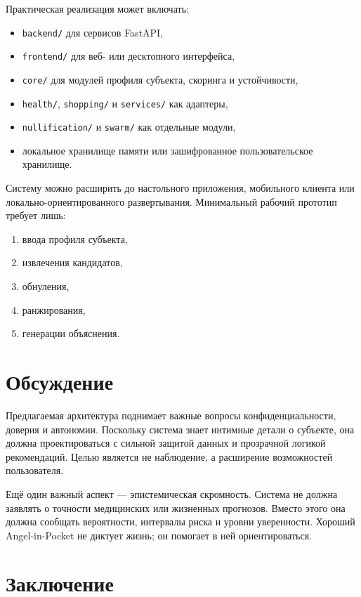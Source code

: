 \documentclass[11pt,a4paper]{article}
\begin{document}
Практическая реализация может включать:
\begin{itemize}[leftmargin=1.2em]
    \item \texttt{backend/} для сервисов FastAPI,
    \item \texttt{frontend/} для веб- или десктопного интерфейса,
    \item \texttt{core/} для модулей профиля субъекта, скоринга и устойчивости,
    \item \texttt{health/}, \texttt{shopping/} и \texttt{services/} как адаптеры,
    \item \texttt{nullification/} и \texttt{swarm/} как отдельные модули,
    \item локальное хранилище памяти или зашифрованное пользовательское хранилище.
\end{itemize}

Систему можно расширить до настольного приложения, мобильного клиента или локально-ориентированного развертывания. Минимальный рабочий прототип требует лишь:
\begin{enumerate}[leftmargin=1.2em]
    \item ввода профиля субъекта,
    \item извлечения кандидатов,
    \item обнуления,
    \item ранжирования,
    \item генерации объяснения.
\end{enumerate}

\section{Обсуждение}

Предлагаемая архитектура поднимает важные вопросы конфиденциальности, доверия и автономии. Поскольку система знает интимные детали о субъекте, она должна проектироваться с сильной защитой данных и прозрачной логикой рекомендаций. Целью является не наблюдение, а расширение возможностей пользователя.

Ещё один важный аспект — эпистемическая скромность. Система не должна заявлять о точности медицинских или жизненных прогнозов. Вместо этого она должна сообщать вероятности, интервалы риска и уровни уверенности. Хороший Angel-in-Pocket не диктует жизнь; он помогает в ней ориентироваться.

\section{Заключение}
\end{document}
